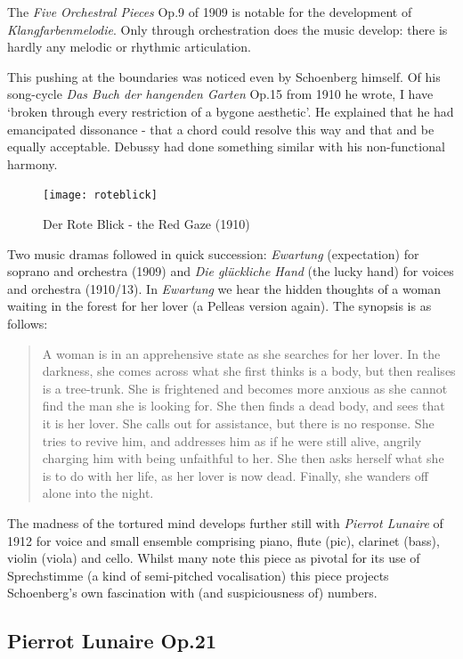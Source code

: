 The \textit{Five Orchestral Pieces} Op.9 of 1909 is notable for the development of \textit{Klangfarbenmelodie}. Only through orchestration does the music develop: there is hardly any melodic or rhythmic articulation. 

This pushing at the boundaries was noticed even by Schoenberg himself. Of his song-cycle \textit{Das Buch der hangenden Garten} Op.15 from 1910 he wrote, I have `broken through every restriction of a bygone aesthetic'. He explained that he had emancipated dissonance - that a chord could resolve this way and that and be equally acceptable. Debussy had done something similar with his non-functional harmony. 

\begin{figure}[H]
\centering
\texttt{[image: roteblick]}\caption{Der Rote Blick - the Red Gaze (1910)}
\label{fig:roteblick}
\end{figure}

Two music dramas followed in quick succession: \textit{Ewartung} (expectation) for soprano and orchestra (1909) and \textit{Die gl\"uckliche Hand} (the lucky hand) for voices and orchestra (1910/13). In \textit{Ewartung} we hear the hidden thoughts of a woman waiting in the forest for her lover (a Pelleas version again). The synopsis is as follows:

\begin{quotation} 
A woman is in an apprehensive state as she searches for her lover. In the darkness, she comes across what she first thinks is a body, but then realises is a tree-trunk. She is frightened and becomes more anxious as she cannot find the man she is looking for. She then finds a dead body, and sees that it is her lover. She calls out for assistance, but there is no response. She tries to revive him, and addresses him as if he were still alive, angrily charging him with being unfaithful to her. She then asks herself what she is to do with her life, as her lover is now dead. Finally, she wanders off alone into the night.
\end{quotation}

The madness of the tortured mind develops further still with \textit{Pierrot Lunaire} of 1912 for voice and small ensemble comprising piano, flute (pic), clarinet (bass), violin (viola) and cello. Whilst many note this piece as pivotal for its use of Sprechstimme (a kind of semi-pitched vocalisation) this piece projects Schoenberg's own fascination with (and suspiciousness of) numbers. 

\subsection{Pierrot Lunaire Op.21}

